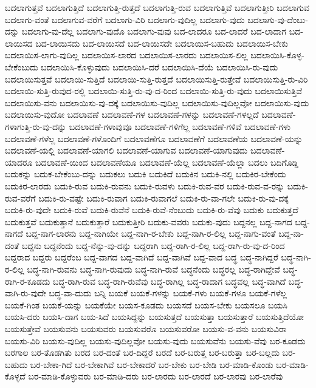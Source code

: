 {ಬದಲಾಗುತ್ತವೆ
ಬದಲಾಗುತ್ತಿದೆ
ಬದಲಾಗುತ್ತಿ-ರುತ್ತದೆ
ಬದಲಾಗುತ್ತಿ-ರುವ
ಬದಲಾಗುತ್ತಿವೆ
ಬದಲಾಗುತ್ತೀರಿ
ಬದಲಾಗುವ
ಬದಲಾಗು-ವಂತೆ
ಬದಲಾಗುವ-ವರೆಗೆ
ಬದಲಾಗು-ವಿರಿ
ಬದಲಾಗು-ವುದಿಲ್ಲ
ಬದಲಾಗು-ವುದು
ಬದಲಾಗು-ವು-ದೆಂಬು-ದನ್ನು
ಬದಲಾಗು-ವು-ದೆಲ್ಲ
ಬದಲಾಗು-ವುದೊ
ಬದಲಾಗು-ವುವು
ಬದ-ಲಾದರೂ
ಬದ-ಲಾದರೆ
ಬದ-ಲಾದಾಗ
ಬದ-ಲಾಯಿಸದ
ಬದ-ಲಾಯಿಸದು
ಬದ-ಲಾಯಿಸದೆ
ಬದ-ಲಾಯಿಸದೇ
ಬದಲಾಯಿಸ-ಬಹುದು
ಬದಲಾಯಿಸ-ಬೇಕು
ಬದಲಾಯಿಸ-ಲಾಗು-ವುದಿಲ್ಲ
ಬದಲಾಯಿಸ-ಲಾರದ
ಬದಲಾಯಿಸ-ಲಾರದು
ಬದಲಾಯಿಸ-ಲಿಲ್ಲ
ಬದಲಾಯಿಸಿ-ಕೊಳ್ಳ-ಬೇಕೆಂಬುದು
ಬದಲಾಯಿಸಿ-ಕೊಳ್ಳುವುದು
ಬದಲಾಯಿಸಿ-ದರೆ
ಬದಲಾಯಿಸಿ-ದೆಯೆ
ಬದಲಾಯಿಸಿ-ರು-ವುದು
ಬದಲಾಯಿಸುತ್ತವೆ
ಬದಲಾಯಿ-ಸುತ್ತಿದೆ
ಬದಲಾಯಿ-ಸುತ್ತಿ-ರುತ್ತದೆ
ಬದಲಾಯಿಸುತ್ತಿ-ರುತ್ತೇವೆ
ಬದಲಾಯಿಸುತ್ತಿ-ರು-ವಿರಿ
ಬದಲಾಯಿ-ಸುತ್ತಿ-ರುವುದ-ರಲ್ಲಿ
ಬದಲಾಯಿ-ಸುತ್ತಿ-ರು-ವು-ದ-ರಿಂದ
ಬದಲಾಯಿ-ಸುತ್ತಿ-ರು-ವುದು
ಬದಲಾಯಿಸುತ್ತಿವೆ
ಬದಲಾಯಿಸು-ವನು
ಬದಲಾಯಿಸು-ವು-ದಕ್ಕೆ
ಬದಲಾಯಿಸು-ವುದಿಲ್ಲ
ಬದಲಾಯಿಸು-ವುದಿಲ್ಲವೋ
ಬದಲಾಯಿಸು-ವುದು
ಬದಲಾಯಿಸು-ವುದೋ
ಬದಲಾವಣೆ
ಬದಲಾವಣೆ-ಗಳ
ಬದಲಾವಣೆ-ಗಳನ್ನು
ಬದಲಾವಣೆ-ಗಳಲ್ಲದೆ
ಬದಲಾವಣೆ-ಗಳಾಗುತ್ತಿ-ರು-ವು-ದನ್ನು
ಬದಲಾವಣೆ-ಗಳಾವುವೂ
ಬದಲಾವಣೆ-ಗಳಿಗೆಲ್ಲ
ಬದಲಾವಣೆ-ಗಳಿವೆ
ಬದಲಾವಣೆ-ಗಳು
ಬದಲಾವಣೆ-ಗಳೆಲ್ಲ
ಬದಲಾವಣೆ-ಗಳೊಂದಿಗೆ
ಬದಲಾವಣೆಗೂ
ಬದಲಾವಣೆಗೆ
ಬದಲಾವಣೆಯ
ಬದಲಾವಣೆ-ಯನ್ನು
ಬದಲಾವಣೆ-ಯಲ್ಲಿ
ಬದಲಾವಣೆ-ಯಾಗಲಿ
ಬದಲಾವಣೆ-ಯಾಗುವ
ಬದಲಾವಣೆ-ಯಾಗುವುದು
ಬದಲಾವಣೆ-ಯಾದರೂ
ಬದಲಾವಣೆ-ಯಿಂದ
ಬದಲಾವಣೆಯೂ
ಬದಲಾವಣೆ-ಯೆಲ್ಲ
ಬದಲಾವಣೆ-ಯೆಲ್ಲಾ
ಬದಲು
ಬದಿಗೊಡ್ಡಿ
ಬದುಕನ್ನು
ಬದುಕ-ಬೇಕೆಂಬು-ದನ್ನು
ಬದುಕಲು
ಬದುಕಿ
ಬದುಕಿದೆ
ಬದುಕಿನ
ಬದುಕಿ-ನಲ್ಲಿ
ಬದುಕಿರ-ಬೇಕೆಂದು
ಬದುಕಿರ-ಲಾರದು
ಬದುಕಿ-ರುವ
ಬದುಕಿ-ರುವನು
ಬದುಕಿ-ರುವಳು
ಬದುಕಿ-ರುವ-ವರ
ಬದುಕಿ-ರುವ-ವ-ರನ್ನು
ಬದುಕಿ-ರುವ-ವರೆಗೆ
ಬದುಕಿ-ರು-ವಷ್ಟೇ
ಬದುಕಿ-ರುವಾಗ
ಬದುಕಿ-ರುವಾಗಲೆ
ಬದುಕಿ-ರು-ವಾ-ಗಲೇ
ಬದುಕಿ-ರು-ವು-ದಕ್ಕೆ
ಬದುಕಿ-ರು-ವುದೇ
ಬದುಕಿ-ರುವೆ
ಬದುಕಿ-ರುವೆನೆ
ಬದುಕಿ-ರುವೆ-ನೆಂಬುದು
ಬದುಕಿ-ರು-ವೆವು
ಬದುಕು
ಬದುಕುತ್ತದೆ
ಬದುಕುತ್ತವೆ
ಬದುಕುತ್ತಾನೆ
ಬದುಕುತ್ತಾರೆ
ಬದುಕುತ್ತೀರಿ
ಬದುಕು-ವವರು
ಬದುಕು-ವುದು
ಬದ್ದನಲ್ಲ
ಬದ್ದ-ನಾಗದ
ಬದ್ದ-ನಾಗದೆ
ಬದ್ದ-ನಾಗ-ಲಾರನು
ಬದ್ದ-ನಾಗಿಯೇ
ಬದ್ದ-ನಾಗಿ-ರ-ಬೇಕು
ಬದ್ದ-ನಾಗಿ-ರ-ಲಿಲ್ಲ
ಬದ್ದ-ನಾಗು-ವಂತೆ
ಬದ್ದ-ನಾ-ದಂತೆ
ಬದ್ದನು
ಬದ್ದನೆಂದು
ಬದ್ದ-ನೆನ್ನು-ವು-ದನ್ನು
ಬದ್ದರಾಗಿ
ಬದ್ದ-ರಾಗಿ-ರ-ಲಿಲ್ಲ
ಬದ್ದ-ರಾಗಿ-ರು-ವು-ದ-ರಿಂದ
ಬದ್ದರಾದ
ಬದ್ದರು
ಬದ್ದರೆಂಬ
ಬದ್ದ-ವಾಗದ
ಬದ್ದ-ವಾಗಿದೆ
ಬದ್ದ-ವಾಗಿವೆ
ಬದ್ದ-ವಾದ
ಬದ್ಧ
ಬದ್ಧ-ನಾಗಿದ್ದರೆ
ಬದ್ಧ-ನಾಗಿ-ರ-ಲಿಲ್ಲ
ಬದ್ಧ-ನಾಗಿ-ರುವನು
ಬದ್ಧ-ನಾಗಿ-ರುವುದು
ಬದ್ಧ-ನಾಗಿ-ರುವೆ
ಬದ್ಧನೆಂದು
ಬದ್ಧರಲ್ಲ
ಬದ್ಧ-ರಾಗಿದ್ದೇವೆ
ಬದ್ಧ-ರಾಗಿ-ರ-ಕೂಡದು
ಬದ್ಧ-ರಾಗಿ-ರುವ
ಬದ್ಧ-ರಾಗಿ-ರುವೆವು
ಬದ್ಧ-ರಾಗಿಲ್ಲ
ಬದ್ಧ-ರಾದಾಗ
ಬದ್ಧವಲ್ಲ
ಬದ್ಧ-ವಾಗಿದೆ
ಬದ್ಧ-ವಾಗಿ-ರು-ವುದೇ
ಬದ್ಧ-ವಾ-ದುದು
ಬನ್ನಿ
ಬಯಕೆ
ಬಯಕೆ-ಗಳನ್ನು
ಬಯಕೆ-ಗಳು
ಬಯಕೆ-ಗಳೂ
ಬಯಕೆ-ಗಳೆಲ್ಲ
ಬಯಕೆ-ಗಿಂತ
ಬಯಕೆ-ಯನ್ನು
ಬಯಕೆಯೇ
ಬಯಸ-ಕೂಡದು
ಬಯಸದೆ
ಬಯಸ-ಬೇಕು
ಬಯಸಲೂ
ಬಯಸಿ
ಬಯಸಿ-ದರು
ಬಯಸಿ-ದಾಗ
ಬಯ-ಸಿದೆ
ಬಯಸಿದ್ದನ್ನು
ಬಯಸುತ್ತದೆ
ಬಯಸುತ್ತಾ
ಬಯಸುತ್ತಾರೆ
ಬಯಸುತ್ತಿದೆಯೋ
ಬಯಸುತ್ತೇವೆ
ಬಯಸುವನು
ಬಯಸುವರು
ಬಯಸುವರೊ
ಬಯಸುವರೋ
ಬಯಸು-ವ-ವನು
ಬಯಸುವಿರಾ
ಬಯಸು-ವಿರಿ
ಬಯಸು-ವುದಿಲ್ಲ
ಬಯಸು-ವುದಿಲ್ಲವೋ
ಬಯಸು-ವುದು
ಬಯಸುವೆನು
ಬಯಸು-ವೆವು
ಬರ-ಕೂಡದು
ಬರಗಾಲ
ಬರ-ತೊಡಗಿತು
ಬರದ
ಬರ-ದಂತೆ
ಬರ-ದಿದ್ದರೆ
ಬರದೆ
ಬರ-ಬರುತ್ತ
ಬರ-ಬರುತ್ತಾ
ಬರ-ಬಲ್ಲದು
ಬರ-ಬಹುದು
ಬರ-ಬೇಕಾ-ಗಿದೆ
ಬರ-ಬೇಕಾಗಿವೆ
ಬರ-ಬೇಕಾದರೆ
ಬರ-ಬೇಕು
ಬರ-ಬೇಡಿ
ಬರ-ಮಾಡಿ-ಕೊಂಡು
ಬರ-ಮಾಡಿ-ಕೊಳ್ಳದೆ
ಬರ-ಮಾಡಿ-ಕೊಳ್ಳುವರು
ಬರ-ಮಾಡಿ-ದರು
ಬರ-ಲಾರದು
ಬರ-ಲಾರದೆ
ಬರ-ಲಾರವು
ಬರ-ಲಾರೆವು
}
